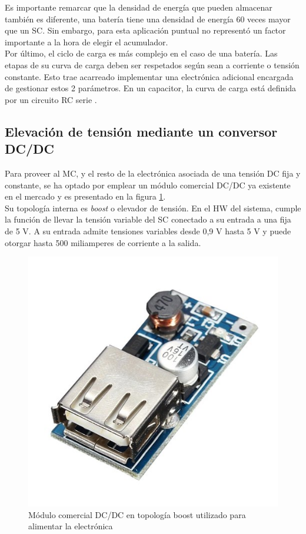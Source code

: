 Es importante remarcar que la densidad de energía que pueden almacenar también es diferente, una batería tiene una densidad de energía 60 veces mayor que un SC. Sin embargo, para esta aplicación puntual no representó un factor importante a la hora de elegir el acumulador.\\
Por último, el ciclo de carga es más complejo en el caso de una batería. Las etapas de su curva de carga deben ser respetados según sean a corriente o tensión constante. Esto trae acarreado implementar una electrónica adicional encargada de gestionar estos 2 parámetros. En un capacitor, la curva de carga está definida por un circuito RC serie \citep{ceraolo2014fundamentals}.\\ 

\subsection{Elevación de tensión mediante un conversor DC/DC }
Para proveer al MC, y el resto de la electrónica asociada de una tensión DC fija y constante, se ha optado por emplear un módulo comercial DC/DC ya existente en el mercado y es presentado en la figura \ref{fig:dcdcboost}.\\
Su topología interna es \textit{boost} o elevador de tensión. En el HW del sistema, cumple la función de llevar la tensión variable del SC conectado a su entrada a una fija de 5 V. 
A su entrada admite tensiones variables desde 0,9 V hasta 5 V y puede otorgar hasta 500 miliamperes de corriente a la salida.
\begin{figure}[h!]
	\centering
	\includegraphics[width=0.5\linewidth]{Figures/dcdc_boost}
	\caption{Módulo comercial DC/DC en topología boost utilizado para alimentar la electrónica}
	\label{fig:dcdcboost}
\end{figure}


